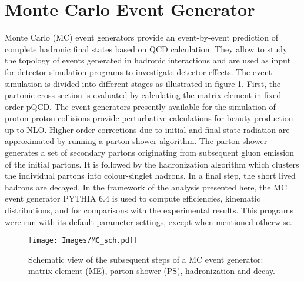 \section{Monte Carlo Event Generator}
Monte Carlo (MC) event generators provide an event-by-event prediction of complete 
hadronic final states based on QCD calculation. They allow to study the
topology of events generated in hadronic interactions and are used as input for
detector simulation programs to investigate detector effects. The event simulation
is divided into different stages as illustrated in figure \ref{MC_sch}. First, the partonic
cross section is evaluated by calculating the matrix element in fixed order pQCD.
The event generators presently available for the simulation of proton-proton collisions 
provide perturbative calculations for beauty production up to NLO. Higher
order corrections due to initial and final state radiation are approximated by running 
a parton shower algorithm. The parton shower generates a set of secondary
partons originating from subsequent gluon emission of the initial partons. It is
followed by the hadronization algorithm which clusters the individual partons into
colour-singlet hadrons. In a final step, the short lived hadrons are decayed. In the
framework of the analysis presented here, the MC event generator PYTHIA 6.4
\cite{PHY} is used to compute efficiencies, kinematic distributions, and for comparisons
with the experimental results. This programs were run with its default parameter
settings, except when mentioned otherwise.
\begin{figure}
\centering
\texttt{[image: Images/MC\_sch.pdf]}
\caption{Schematic view of the subsequent steps of a MC event generator:
matrix element (ME), parton shower (PS), hadronization and decay.}
\label{MC_sch}
\end{figure}

